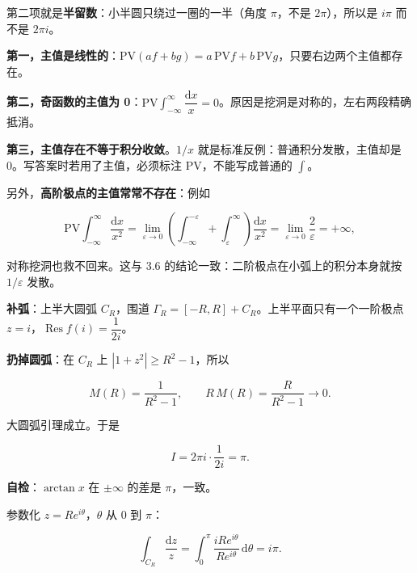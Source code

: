 \documentclass[11pt]{ctexart}
\renewcommand{\qbreak}{\needspace{0.45\textheight}}
\let\origsubhdr\subhdr
\renewcommand{\subhdr}[1]{\par\needspace{4\baselineskip}\origsubhdr{#1}}
\let\orighdr\hdr
\renewcommand{\hdr}[2]{\par\orighdr{#1}{#2}}
\begin{document}
第二项就是\textbf{半留数}：小半圆只绕过一圈的一半（角度 $\pi$，不是 $2\pi$），所以是 $i\pi$ 而不是 $2\pi i$。



\textbf{第一，主值是线性的}：$\mathrm{PV}(af+bg)=a\,\mathrm{PV}f+b\,\mathrm{PV}g$，只要右边两个主值都存在。

\textbf{第二，奇函数的主值为 0}：$\mathrm{PV}\!\int_{-\infty}^{\infty}\dfrac{\mathrm{d}x}{x}=0$。原因是挖洞是对称的，左右两段精确抵消。

\textbf{第三，主值存在不等于积分收敛}。$1/x$ 就是标准反例：普通积分发散，主值却是 0。写答案时若用了主值，必须标注 $\mathrm{PV}$，不能写成普通的 $\int$。

另外，\textbf{高阶极点的主值常常不存在}：例如

$$
\mathrm{PV}\!\int_{-\infty}^{\infty}\frac{\mathrm{d}x}{x^{2}}
=\lim_{\varepsilon\to0}\left(\int_{-\infty}^{-\varepsilon}+\int_{\varepsilon}^{\infty}\right)\frac{\mathrm{d}x}{x^{2}}
=\lim_{\varepsilon\to0}\frac{2}{\varepsilon}=+\infty ,
$$

对称挖洞也救不回来。这与 3.6 的结论一致：二阶极点在小弧上的积分本身就按 $1/\varepsilon$ 发散。


\qbreak
{}

\textbf{补弧}：上半大圆弧 $C_R$，围道 $\Gamma_R=[-R,R]+C_R$。上半平面只有一个一阶极点 $z=i$，$\operatorname{Res}f(i)=\dfrac{1}{2i}$。

\textbf{扔掉圆弧}：在 $C_R$ 上 $|1+z^{2}|\ge R^{2}-1$，所以

$$
M(R)=\frac{1}{R^{2}-1},\qquad R\,M(R)=\frac{R}{R^{2}-1}\to0 .
$$

大圆弧引理成立。于是

$$
I=2\pi i\cdot\frac{1}{2i}=\pi .
$$

\textbf{自检}：$\arctan x$ 在 $\pm\infty$ 的差是 $\pi$，一致。

\qbreak
{}

参数化 $z=Re^{i\theta}$，$\theta$ 从 $0$ 到 $\pi$：

$$
\int_{C_R}\frac{\mathrm{d}z}{z}
=\int_0^{\pi}\frac{iRe^{i\theta}}{Re^{i\theta}}\,\mathrm{d}\theta
=i\pi .
$$
\end{document}
